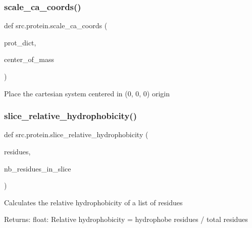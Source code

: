 \subsubsection{\texorpdfstring{scale\+\_\+ca\+\_\+coords()}{scale\_ca\_coords()}}
{\footnotesize\ttfamily def src.\+protein.\+scale\+\_\+ca\+\_\+coords (\begin{DoxyParamCaption}\item[{}]{prot\+\_\+dict,  }\item[{}]{center\+\_\+of\+\_\+mass }\end{DoxyParamCaption})}

\begin{DoxyVerb}Place the cartesian system centered in (0, 0, 0) origin\end{DoxyVerb}
 \mbox{\label{namespacesrc_1_1protein_a18d36b5a363ac29227c8cd0828c208bb}} 
\subsubsection{\texorpdfstring{slice\+\_\+relative\+\_\+hydrophobicity()}{slice\_relative\_hydrophobicity()}}
{\footnotesize\ttfamily def src.\+protein.\+slice\+\_\+relative\+\_\+hydrophobicity (\begin{DoxyParamCaption}\item[{}]{residues,  }\item[{}]{nb\+\_\+residues\+\_\+in\+\_\+slice }\end{DoxyParamCaption})}

\begin{DoxyVerb}Calculates the relative hydrophobicity of a list of residues

    Returns:
        float: Relative hydrophobicity = hydrophobe residues / total residues
\end{DoxyVerb}
 